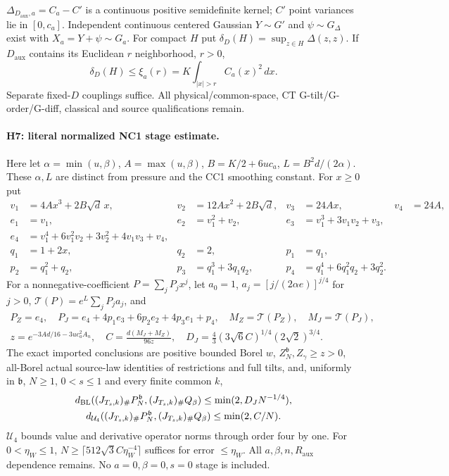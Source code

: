 $\Delta_{D_{\mathrm{aux}},a}=C_a-C'$ is a continuous positive semidefinite
kernel; $C'$ point variances lie in $[0,c_a]$. Independent continuous
centered Gaussian $Y\sim G'$ and $\psi\sim G_\Delta$ exist with
$X_a=Y+\psi\sim G_a$. For compact $H$ put
$\delta_D(H)=\sup_{z\in H}\Delta(z,z)$. If $D_{\mathrm{aux}}$ contains
its Euclidean $r$ neighborhood, $r>0$,
\[
 \delta_D(H)\le\xi_a(r)=K\int_{|x|>r}C_a(x)^2\,dx.
\]
Separate fixed-$D$ couplings suffice. All physical/common-space,
CT G-tilt/G-order/G-diff, classical and source qualifications remain.

\paragraph{H7: literal normalized NC1 stage estimate.}
Here let $\alpha=\min(u,\beta)$, $A=\max(u,\beta)$, $B=K/2+6uc_a$,
$L=B^2d/(2\alpha)$. These $\alpha,L$ are distinct from pressure and the
CC1 smoothing constant. For $x\ge0$ put
\begin{align*}
 v_1&=4Ax^3+2B\sqrt d\,x,&v_2&=12Ax^2+2B\sqrt d,&v_3&=24Ax,&v_4&=24A,\\
 e_1&=v_1,&e_2&=v_1^2+v_2,&e_3&=v_1^3+3v_1v_2+v_3,\\
 e_4&=v_1^4+6v_1^2v_2+3v_2^2+4v_1v_3+v_4,\\
 q_1&=1+2x,&q_2&=2,&p_1&=q_1,\\
 p_2&=q_1^2+q_2,&p_3&=q_1^3+3q_1q_2,&p_4&=q_1^4+6q_1^2q_2+3q_2^2.
\end{align*}
For a nonnegative-coefficient $P=\sum_jP_jx^j$, let $a_0=1$,
$a_j=[j/(2\alpha e)]^{j/4}$ for $j>0$, $\mathcal T(P)=e^L\sum_jP_ja_j$,
and
\begin{gather*}
 P_Z=e_4,\quad P_J=e_4+4p_1e_3+6p_2e_2+4p_3e_1+p_4,\quad
 M_Z=\mathcal T(P_Z),\quad M_J=\mathcal T(P_J),\\
 z=e^{-3Ad/16-3uc_a^2A_n},\quad C=\frac{d(M_J+M_Z)}{96z},\quad
 D_J=\frac43(3\sqrt6C)^{1/4}(2\sqrt2)^{3/4}.
\end{gather*}
The exact imported conclusions are positive bounded Borel $w$,
$Z_N^{\mathfrak b},Z_\gamma\ge z>0$, all-Borel actual source-law identities
of restrictions and full tilts, and, uniformly in $\mathfrak b$, $N\ge1$,
$0<s\le1$ and every finite common $k$,
\begin{gather*}
 d_{\mathrm{BL}}((J_{T_s,k})_\#P_N^{\mathfrak b},(J_{T_s,k})_\#Q_\beta)
        \le\min(2,D_JN^{-1/4}),\\
 d_{\mathcal U_4}((J_{T_s,k})_\#P_N^{\mathfrak b},(J_{T_s,k})_\#Q_\beta)
        \le\min(2,C/N).
\end{gather*}
$\mathcal U_4$ bounds value and derivative operator norms through order four
by one. For $0<\eta_W\le1$,
$N\ge\lceil512\sqrt3 C\eta_W^{-4}\rceil$ suffices for error $\le\eta_W$.
All $a,\beta,n,R_{\mathrm{aux}}$ dependence remains. No $a=0,\beta=0,s=0$
stage is included.

